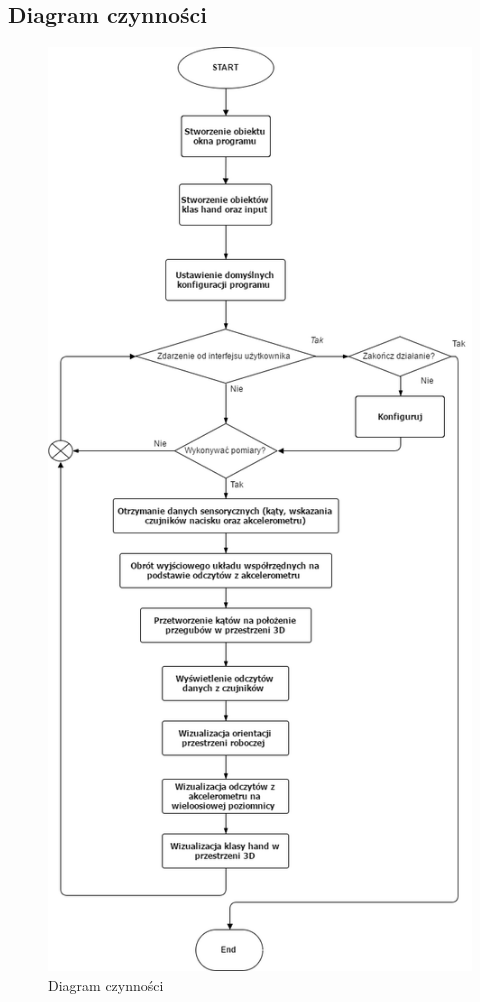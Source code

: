 \documentclass[10pt,a4paper]{article}
\begin{document}
\subsection{Diagram czynności}
\begin{figure}[!htb]
\centering
\includegraphics[height=0.8\textheight]{./Diagram_przeplywu_sterowania.png}
\caption{Diagram czynności}
\end{figure}
\end{document}
